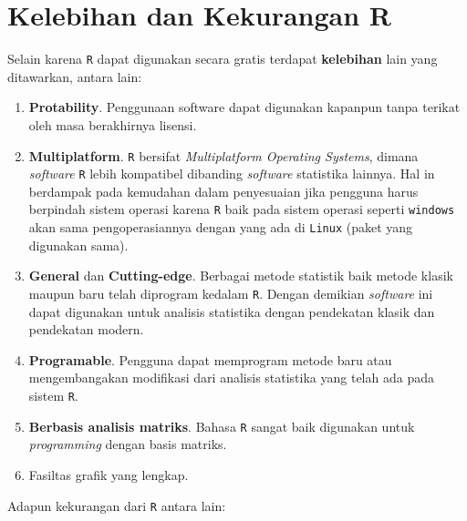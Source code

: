 \documentclass[]{book}
\providecommand{\tightlist}{%
  \setlength{\itemsep}{0pt}\setlength{\parskip}{0pt}}
\theoremstyle{definition}
\theoremstyle{definition}
\theoremstyle{definition}
\theoremstyle{remark}
\begin{document}
\hypertarget{prosconsR}{%
\section{Kelebihan dan Kekurangan R}\label{prosconsR}}

Selain karena \texttt{R} dapat digunakan secara gratis terdapat \textbf{kelebihan} lain yang ditawarkan, antara lain:

\begin{enumerate}
\def\labelenumi{\arabic{enumi}.}
\tightlist
\item
  \textbf{Protability}. Penggunaan software dapat digunakan kapanpun tanpa terikat oleh masa berakhirnya lisensi.
\item
  \textbf{Multiplatform}. \texttt{R} bersifat \emph{Multiplatform Operating Systems}, dimana \emph{software} \texttt{R} lebih kompatibel dibanding \emph{software} statistika lainnya. Hal in berdampak pada kemudahan dalam penyesuaian jika pengguna harus berpindah sistem operasi karena \texttt{R} baik pada sistem operasi seperti \texttt{windows} akan sama pengoperasiannya dengan yang ada di \texttt{Linux} (paket yang digunakan sama).
\item
  \textbf{General} dan \textbf{Cutting-edge}. Berbagai metode statistik baik metode klasik maupun baru telah diprogram kedalam \texttt{R}. Dengan demikian \emph{software} ini dapat digunakan untuk analisis statistika dengan pendekatan klasik dan pendekatan modern.
\item
  \textbf{Programable}. Pengguna dapat memprogram metode baru atau mengembangakan modifikasi dari analisis statistika yang telah ada pada sistem \texttt{R}.
\item
  \textbf{Berbasis analisis matriks}. Bahasa \texttt{R} sangat baik digunakan untuk \emph{programming} dengan basis matriks.
\item
  Fasiltas grafik yang lengkap.
\end{enumerate}

Adapun kekurangan dari \texttt{R} antara lain:
\end{document}
